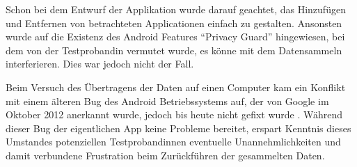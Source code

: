 Schon bei dem Entwurf der Applikation wurde darauf geachtet, das Hinzufügen und Entfernen von betrachteten Applicationen einfach zu gestalten.
Ansonsten wurde auf die Existenz des Android Features "`Privacy Guard"' hingewiesen, bei dem von der Testprobandin vermutet wurde, es könne mit dem Datensammeln interferieren.
Dies war jedoch nicht der Fall.
\par
Beim Versuch des Übertragens der Daten auf einen Computer kam ein Konflikt mit einem älteren Bug des Android Betriebssystems auf, der von Google im Oktober 2012 anerkannt wurde, jedoch bis heute nicht gefixt wurde
\cite{androidbug}.
Während dieser Bug der eigentlichen App keine Probleme bereitet, erspart Kenntnis dieses Umstandes potenziellen Testprobandinnen eventuelle Unannehmlichkeiten und damit verbundene Frustration beim Zurückführen der gesammelten Daten.


